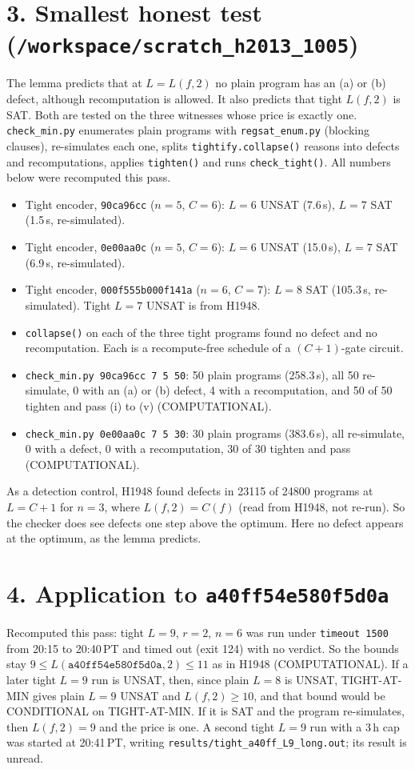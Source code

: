 \documentclass[11pt]{article}
\begin{document}
\section*{3. Smallest honest test (\texttt{/workspace/scratch\_h2013\_1005})}
The lemma predicts that at $L=L(f,2)$ no plain program has an (a) or (b) defect, although recomputation is allowed. It also predicts that tight $L(f,2)$ is SAT. Both are tested on the three witnesses whose price is exactly one. \texttt{check\_min.py} enumerates plain programs with \texttt{regsat\_enum.py} (blocking clauses), re-simulates each one, splits \texttt{tightify.collapse()} reasons into defects and recomputations, applies \texttt{tighten()} and runs \texttt{check\_tight()}. All numbers below were recomputed this pass.
\begin{itemize}
\item Tight encoder, \texttt{90ca96cc} ($n=5$, $C=6$): $L=6$ UNSAT (7.6\,s), $L=7$ SAT (1.5\,s, re-simulated).
\item Tight encoder, \texttt{0e00aa0c} ($n=5$, $C=6$): $L=6$ UNSAT (15.0\,s), $L=7$ SAT (6.9\,s, re-simulated).
\item Tight encoder, \texttt{000f555b000f141a} ($n=6$, $C=7$): $L=8$ SAT (105.3\,s, re-simulated). Tight $L=7$ UNSAT is from H1948.
\item \texttt{collapse()} on each of the three tight programs found no defect and no recomputation. Each is a recompute-free schedule of a $(C+1)$-gate circuit.
\item \texttt{check\_min.py 90ca96cc 7 5 50}: 50 plain programs (258.3\,s), all 50 re-simulate, 0 with an (a) or (b) defect, 4 with a recomputation, and 50 of 50 tighten and pass (i) to (v) (COMPUTATIONAL).
\item \texttt{check\_min.py 0e00aa0c 7 5 30}: 30 plain programs (383.6\,s), all re-simulate, 0 with a defect, 0 with a recomputation, 30 of 30 tighten and pass (COMPUTATIONAL).
\end{itemize}
As a detection control, H1948 found defects in 23115 of 24800 programs at $L=C+1$ for $n=3$, where $L(f,2)=C(f)$ (read from H1948, not re-run). So the checker does see defects one step above the optimum. Here no defect appears at the optimum, as the lemma predicts.

\section*{4. Application to \texttt{a40ff54e580f5d0a}}
Recomputed this pass: tight $L=9$, $r=2$, $n=6$ was run under \texttt{timeout 1500} from 20:15 to 20:40\,PT and timed out (exit 124) with no verdict. So the bounds stay $9\le L(\texttt{a40ff54e580f5d0a},2)\le 11$ as in H1948 (COMPUTATIONAL). If a later tight $L=9$ run is UNSAT, then, since plain $L=8$ is UNSAT, TIGHT-AT-MIN gives plain $L=9$ UNSAT and $L(f,2)\ge 10$, and that bound would be CONDITIONAL on TIGHT-AT-MIN. If it is SAT and the program re-simulates, then $L(f,2)=9$ and the price is one. A second tight $L=9$ run with a 3\,h cap was started at 20:41\,PT, writing \texttt{results/tight\_a40ff\_L9\_long.out}; its result is unread.
\end{document}
